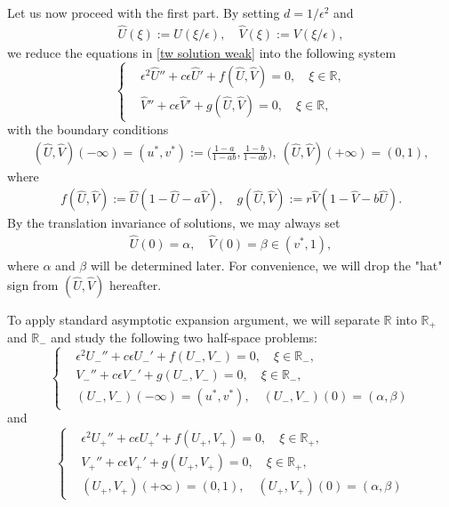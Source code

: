\documentclass[11pt,a4paper]{article}
\numberwithin{equation}{section}
\numberwithin{figure}{section}
\newcommand\bea{\begin{eqnarray}}
\newcommand\eea{\end{eqnarray}}
\newcommand\beaa{\begin{eqnarray*}}
\newcommand\eeaa{\end{eqnarray*}}
\begin{document}
Let us now proceed with the first part.
By setting $d=1/\epsilon^2$ and
\beaa
\hat{U}(\xi):=U(\xi/\epsilon ),\quad \hat{V}(\xi):=V( \xi/\epsilon),
\eeaa
we reduce the equations in \eqref{tw solution weak} into the following system
\begin{equation}\label{singular system}
\left\{
\begin{aligned}
&\epsilon^2\hat{U}''+c\epsilon\hat{U}'+f(\hat{U},\hat{V})=0,\quad \xi\in\mathbb{R},\\
&\hat{V}''+c\epsilon \hat{V}'+g(\hat{U},\hat{V})=0,\quad \xi\in\mathbb{R},
\end{aligned}
\right.
\end{equation}
with the boundary conditions
\bea\label{singular BC}
(\hat{U},\hat{V})(-\infty)=(u^*,v^*):=\Big(\frac{1-a}{1-ab},\frac{1-b}{1-ab}\Big),\ (\hat{U},\hat{V})(+\infty)=(0,1),
\eea
where
\bea\label{fg-def}
f(\hat{U},\hat{V}):=\hat{U}(1-\hat{U}-a\hat{V}),\quad g(\hat{U},\hat{V}):=r\hat{V}(1-\hat{V}-b\hat{U}).
\eea
By the translation invariance of solutions, we may always set
\beaa
\hat{U}(0)=\alpha,\quad  \hat{V}(0)=\beta\in(v^*,1),
\eeaa
where $\alpha$ and $\beta$ will be determined later.
For convenience, we will drop the "hat" sign from $(\hat{U},\hat{V})$ hereafter.





To apply standard asymptotic expansion argument, we will separate $\mathbb{R}$ into $\mathbb{R}_+$ and $\mathbb{R}_-$ and study the following two half-space problems:
\begin{equation}\label{system:R-}
\left\{
\begin{aligned}
&\epsilon^2 U_{-}''+c\epsilon U_{-}'+f(U_-,V_-)=0,\quad \xi\in\mathbb{R}_-,\\
&V_{-}''+c\epsilon V_{-}'+g(U_-,V_-)=0,\quad \xi\in\mathbb{R}_-,\\
&(U_{-},V_{-})(-\infty)=(u^*,v^*),\quad (U_{-},V_{-})(0)=(\alpha,\beta)
\end{aligned}
\right.
\end{equation}
and
\begin{equation}\label{system:R+}
\left\{
\begin{aligned}
&\epsilon^2 U_{+}''+c\epsilon U_{+}'+f(U_+,V_+)=0,\quad \xi\in\mathbb{R}_+,\\
&V_{+}''+c\epsilon V_{+}'+g(U_+,V_+)=0,\quad \xi\in\mathbb{R}_+,\\
&(U_{+},V_{+})(+\infty)=(0,1),\quad (U_{+},V_{+})(0)=(\alpha,\beta)
\end{aligned}
\right.
\end{equation}
\end{document}
